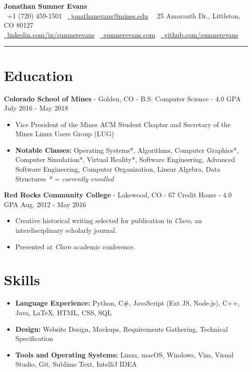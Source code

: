 \documentclass[10pt,letterpaper]{article}
\begin{document}
\begin{center}
    {\huge\textbf{Jonathan Sumner Evans}} \\
    \vspace{3pt}
    \faPhone\ +1 (720) 459-1501
    \textbar\ \href{mailto:jonathanevans@mines.edu}{\faEnvelope\ jonathanevans@mines.edu}
    \textbar\ \faHome\ 25 Amaranth Dr., Littleton, CO 80127 \\
    \href{https://www.linkedin.com/in/sumnerevans}{\faLinkedin\
    linkedin.com/in/sumnerevans}
    \textbar\ \href{http://sumnerevans.com}{\faGlobe\ sumnerevans.com}
    \textbar\ \href{https://github.com/sumnerevans}{\faGithub\
    github.com/sumnerevans}
    \rule{\textwidth}{0.5pt}
\end{center}

\section*{Education}
\textbf{Colorado School of Mines} - Golden, CO - B.S. Computer Science - 4.0 GPA
\hfill July 2016 - May 2018
\begin{itemize}
    \item Vice President of the Mines ACM Student Chapter and Secretary of the
        Mines Linux Users Group (LUG)
    \item \textbf{Notable Classes:} Operating Systems*, Algorithms, Computer
        Graphics*, Computer Simulation*, Virtual Reality*, Software Engineering,
        Advanced Software Engineering, Computer Organization, Linear Algebra,
        Data Structures \hfill\textit{* = currently enrolled}
\end{itemize}

\vspace{2pt}
\textbf{Red Rocks Community College} - Lakewood, CO - 67 Credit Hours - 4.0 GPA
\hfill Aug. 2012 - May 2016
\begin{itemize}
    \item Creative historical writing selected for publication in
        \textit{Claro}, an interdisciplinary scholarly journal.
    \item Presented at \textit{Claro} academic conference.
\end{itemize}

\section*{Skills}
{\renewcommand\labelitemi{}
    \renewcommand\leftmargini{0pt}
    \begin{itemize}
        \item \textbf{Language Experience:} Python, C\#, JavaScript (Ext JS,
            Node.js), C++, Java, {\selectfont\LaTeX}, HTML, CSS,
            SQL
        \item \textbf{Design:} Website Design, Mockups, Requirements Gathering,
            Technical Specification
        \item \textbf{Tools and Operating Systems:} Linux, macOS, Windows, Vim,
            Visual Studio, Git, Sublime Text, IntelliJ IDEA
    \end{itemize}
}
\end{document}

